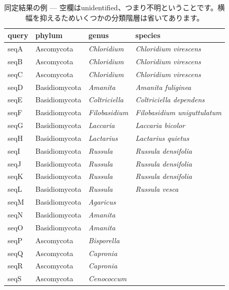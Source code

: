 \documentclass[titlepage,10pt,a4paper]{jsbook}
\begin{document}
\begin{table}[h]
\begin{center}
\footnotesize\setlength{\baselineskip}{0.9em}%
\begin{tabular}{l|lll} 
query & phylum & genus & species \\\hline\hline
seqA & Ascomycota & \textit{Chloridium} & \textit{Chloridium virescens} \\
seqB & Ascomycota & \textit{Chloridium} & \textit{Chloridium virescens} \\
seqC & Ascomycota & \textit{Chloridium} & \textit{Chloridium virescens} \\
seqD & Basidiomycota & \textit{Amanita} & \textit{Amanita fuliginea} \\
seqE & Basidiomycota & \textit{Coltriciella} & \textit{Coltriciella dependens} \\
seqF & Basidiomycota & \textit{Filobasidium} & \textit{Filobasidium uniguttulatum} \\
seqG & Basidiomycota & \textit{Laccaria} & \textit{Laccaria bicolor} \\
seqH & Basidiomycota & \textit{Lactarius} & \textit{Lactarius quietus} \\
seqI & Basidiomycota & \textit{Russula} & \textit{Russula densifolia} \\
seqJ & Basidiomycota & \textit{Russula} & \textit{Russula densifolia} \\
seqK & Basidiomycota & \textit{Russula} & \textit{Russula densifolia} \\
seqL & Basidiomycota & \textit{Russula} & \textit{Russula vesca} \\
seqM & Basidiomycota & \textit{Agaricus} &  \\
seqN & Basidiomycota & \textit{Amanita} &  \\
seqO & Basidiomycota & \textit{Amanita} &  \\
seqP & Ascomycota & \textit{Bisporella} &  \\
seqQ & Ascomycota & \textit{Capronia} &  \\
seqR & Ascomycota & \textit{Capronia} &  \\
seqS & Ascomycota & \textit{Cenococcum} &  \\
\end{tabular}
\end{center}
\caption{同定結果の例 --- 空欄はunidentified、つまり不明ということです。横幅を抑えるためいくつかの分類階層は省いてあります。}
\label{table:exampleresultsofidentification}
\end{table}
\end{document}
